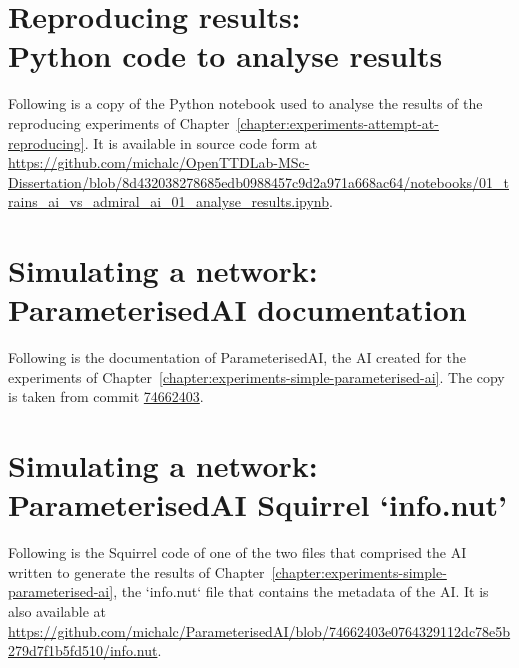 \documentclass[logo,msc,dsti]{style/infthesis}    %
\begin{document}
{\chapter[Reproducing results: Python code to analyse results]{Reproducing results:\texorpdfstring{\\}{ }Python code to analyse results}
\label{chapter:trains-vs-admiral-analyse-results}

Following is a copy of the Python notebook used to analyse the results of the reproducing experiments of Chapter~\ref{chapter:experiments-attempt-at-reproducing}. It is available in source code form at \url{https://github.com/michalc/OpenTTDLab-MSc-Dissertation/blob/8d432038278685edb0988457c9d2a971a668ac64/notebooks/01_trains_ai_vs_admiral_ai_01_analyse_results.ipynb}.



\chapter[Simulating a network: ParameterisedAI documentation]{Simulating a network:\texorpdfstring{\\}{ }ParameterisedAI documentation}
\label{chapter:simulating-a-network-documentation}

Following is the documentation of ParameterisedAI, the AI created for the experiments of Chapter~\ref{chapter:experiments-simple-parameterised-ai}. The copy is taken from commit \href{https://github.com/michalc/ParameterisedAI/tree/74662403e0764329112dc78e5b279d7f1b5fd510}{74662403}.



\chapter[Simulating a network: ParameterisedAI Squirrel `info.nut']{Simulating a network:\texorpdfstring{\\}{ }ParameterisedAI Squirrel `info.nut'}
\label{chapter:simulating-a-network-squirrel-info}

Following is the Squirrel code of one of the two files that comprised the AI written to generate the results of Chapter~\ref{chapter:experiments-simple-parameterised-ai}, the `info.nut` file that contains the metadata of the AI. It is also available at \url{https://github.com/michalc/ParameterisedAI/blob/74662403e0764329112dc78e5b279d7f1b5fd510/info.nut}.

}
\end{document}
